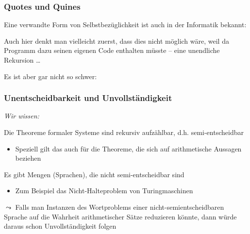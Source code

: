 \documentclass[onlymath]{beamer}
\begin{document}
\begin{frame}\frametitle{Quotes und Quines}

Eine verwandte Form von Selbstbezüglichkeit ist auch in der Informatik bekannt:\medskip


Auch hier denkt man vielleicht zuerst, dass dies nicht möglich wäre, weil da Programm dazu seinen eigenen Code enthalten müsste -- eine unendliche Rekursion \ldots\medskip
\pause

Es ist aber gar nicht so schwer:
\bigskip
{}

\end{frame}


\begin{frame}\frametitle{Unentscheidbarkeit und Unvollständigkeit}

\emph{Wir wissen:}\medskip

Die Theoreme formaler Systeme sind rekursiv aufzählbar, d.h. semi-entscheidbar
\begin{itemize}
\item Speziell gilt das auch für die Theoreme, die sich auf arithmetische Aussagen beziehen
\end{itemize}\medskip

Es gibt Mengen (Sprachen), die nicht semi-entscheidbar sind
\begin{itemize}
\item Zum Beispiel das Nicht-Halteproblem von Turingmaschinen
\end{itemize}
\bigskip\pause

\alert{
$\leadsto$ Falls man Instanzen des Wortproblems einer nicht-semientscheidbaren Sprache auf die Wahrheit arithmetischer Sätze reduzieren könnte, dann würde daraus schon Unvollständigkeit folgen}

\end{frame}
\end{document}
